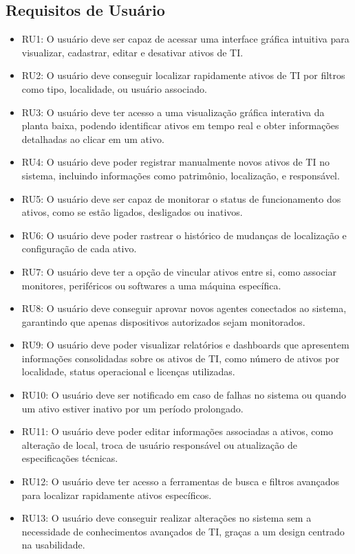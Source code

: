 \subsection{Requisitos de Usuário}
\begin{itemize}
\item RU1: O usuário deve ser capaz de acessar uma interface gráfica intuitiva para visualizar, cadastrar, editar e desativar ativos de TI.  
    \item RU2: O usuário deve conseguir localizar rapidamente ativos de TI por filtros como tipo, localidade, ou usuário associado.  
    \item RU3: O usuário deve ter acesso a uma visualização gráfica interativa da planta baixa, podendo identificar ativos em tempo real e obter informações detalhadas ao clicar em um ativo.  
    \item RU4: O usuário deve poder registrar manualmente novos ativos de TI no sistema, incluindo informações como patrimônio, localização, e responsável.  
    \item RU5: O usuário deve ser capaz de monitorar o status de funcionamento dos ativos, como se estão ligados, desligados ou inativos.  
    \item RU6: O usuário deve poder rastrear o histórico de mudanças de localização e configuração de cada ativo.  
    \item RU7: O usuário deve ter a opção de vincular ativos entre si, como associar monitores, periféricos ou softwares a uma máquina específica.  
    \item RU8: O usuário deve conseguir aprovar novos agentes conectados ao sistema, garantindo que apenas dispositivos autorizados sejam monitorados.  
    \item RU9: O usuário deve poder visualizar relatórios e dashboards que apresentem informações consolidadas sobre os ativos de TI, como número de ativos por localidade, status operacional e licenças utilizadas.  
    \item RU10: O usuário deve ser notificado em caso de falhas no sistema ou quando um ativo estiver inativo por um período prolongado.  
    \item RU11: O usuário deve poder editar informações associadas a ativos, como alteração de local, troca de usuário responsável ou atualização de especificações técnicas.  
    \item RU12: O usuário deve ter acesso a ferramentas de busca e filtros avançados para localizar rapidamente ativos específicos.  
    \item RU13: O usuário deve conseguir realizar alterações no sistema sem a necessidade de conhecimentos avançados de TI, graças a um design centrado na usabilidade.  

\end{itemize}
